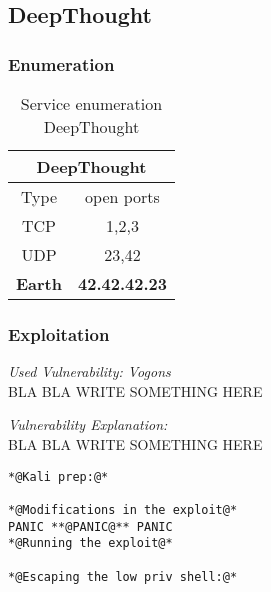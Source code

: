 \renewcommand{\hostname}{DeepThought}
\renewcommand{\os}{Earth}
\renewcommand{\ip}{42.42.42.23}
\renewcommand{\tcpports}{1,2,3}
\renewcommand{\udpports}{23,42}
\renewcommand{\vuln}{Vogons}
\toggletrue{priv}

 
\subsection{\hostname}
\subsubsection{Enumeration}

	\label{tab:\hostname}
\begin{longtable}{|c|c|}
\caption{Service enumeration \hostname}\\
\hline
\multicolumn{2}{|c|}{\textbf{\hostname}}\\
\hline
\hline
Type&open ports\\
\hline
TCP&\tcpports{}\\
\hline
UDP&\udpports{}\\

\hline
\hline
\multicolumn{1}{|c|}{\textbf{\os}}&\multicolumn{1}{|c|}{\textbf{\ip}}\\
\hline


\end{longtable}
\subsubsection{Exploitation}

\textit{Used Vulnerability: \vuln}\\
BLA BLA WRITE SOMETHING HERE 

\textit{Vulnerability Explanation:}\\
BLA BLA WRITE SOMETHING HERE 


\begin{lstlisting}[caption={Exploitation of \hostname},label=\hostname-exploit]
*@Kali prep:@*

*@Modifications in the exploit@*
PANIC **@PANIC@** PANIC
*@Running the exploit@*

*@Escaping the low priv shell:@*
\end{lstlisting}


